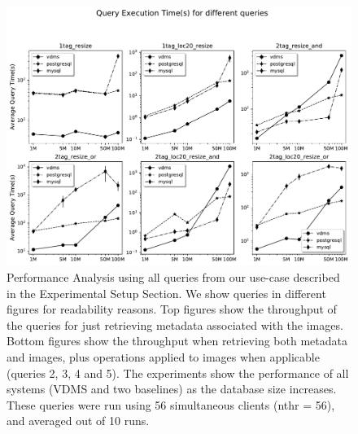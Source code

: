 \begin{figure}[ht]
\includegraphics[width=\textwidth]{figures/plot_56_mosaic_query_times}
\caption{Performance Analysis using all queries from our use-case
described in the Experimental Setup Section.
We show queries in different figures for readability reasons.
Top figures show the throughput of the queries for
just retrieving metadata associated with the images.
Bottom figures show the throughput when retrieving both metadata and images,
plus operations applied to images when applicable (queries 2, 3, 4 and 5).
The experiments show the performance of all systems (VDMS and two baselines) as the
database size increases.
These queries were run using 56 simultaneous clients (nthr = 56),
and averaged out of 10 runs.}
\label{fig:q_performance_56}
\end{figure}


